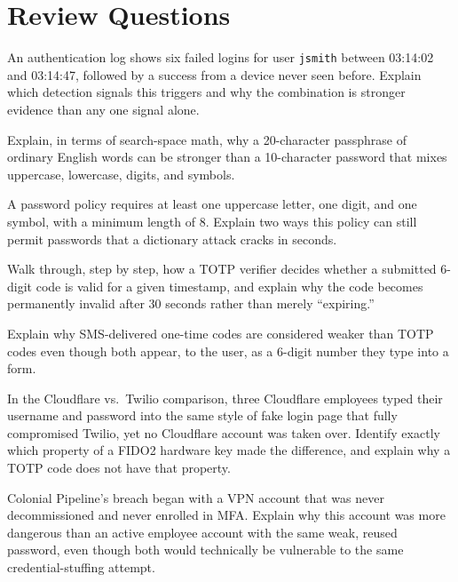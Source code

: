 \section*{Review Questions}
\begin{reviewquestions}
\item An authentication log shows six failed logins for user \texttt{jsmith} between 03:14:02 and
03:14:47, followed by a success from a device never seen before. Explain which detection signals
this triggers and why the combination is stronger evidence than any one signal alone.
\item Explain, in terms of search-space math, why a 20-character passphrase of ordinary English
words can be stronger than a 10-character password that mixes uppercase, lowercase, digits, and
symbols.
\item A password policy requires at least one uppercase letter, one digit, and one symbol, with a
minimum length of 8. Explain two ways this policy can still permit passwords that a dictionary
attack cracks in seconds.
\item Walk through, step by step, how a TOTP verifier decides whether a submitted 6-digit code is
valid for a given timestamp, and explain why the code becomes permanently invalid after 30
seconds rather than merely ``expiring.''
\item Explain why SMS-delivered one-time codes are considered weaker than TOTP codes even though
both appear, to the user, as a 6-digit number they type into a form.
\item In the Cloudflare vs.\ Twilio comparison, three Cloudflare employees typed their username and
password into the same style of fake login page that fully compromised Twilio, yet no Cloudflare
account was taken over. Identify exactly which property of a FIDO2 hardware key made the
difference, and explain why a TOTP code does not have that property.
\item Colonial Pipeline's breach began with a VPN account that was never decommissioned and never
enrolled in MFA. Explain why this account was more dangerous than an active employee account with
the same weak, reused password, even though both would technically be vulnerable to the same
credential-stuffing attempt.
\end{reviewquestions}

